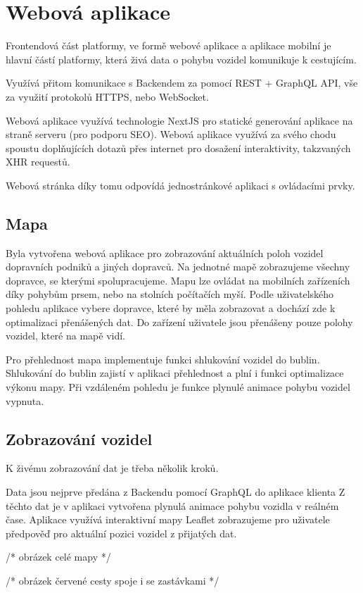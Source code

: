 \section{Webová aplikace}

Frontendová část platformy, ve formě webové aplikace a aplikace mobilní je hlavní částí platformy, která živá data o pohybu vozidel komunikuje k cestujícím.

Využívá přitom komunikace s Backendem za pomocí REST + GraphQL API, vše za využití protokolů HTTPS, nebo WebSocket.

Webová aplikace využívá technologie NextJS pro statické generování aplikace na straně serveru (pro podporu SEO).
Webová aplikace využívá za svého chodu spoustu doplňujících dotazů přes internet pro dosažení interaktivity, takzvaných XHR requestů.

Webová stránka díky tomu odpovídá jednostránkové aplikaci s ovládacími prvky.

\subsection{Mapa}
Byla vytvořena webová aplikace pro zobrazování aktuálních poloh vozidel dopravních podniků a jiných dopravců.
Na jednotné mapě zobrazujeme všechny dopravce, se kterými spolupracujeme.
Mapu lze ovládat na mobilních zařízeních díky pohybům prsem, nebo na stolních počítačích myší. Podle uživatelského pohledu aplikace vybere dopravce, které by měla zobrazovat a dochází zde k optimalizaci přenášených dat. Do zařízení uživatele jsou přenášeny pouze polohy vozidel, které na mapě vidí.

Pro přehlednost mapa implementuje funkci shlukování vozidel do bublin. Shlukování do bublin zajistí v aplikaci přehlednost a plní i funkci optimalizace výkonu mapy.
Při vzdáleném pohledu je funkce plynulé animace pohybu vozidel vypnuta.

\subsection{Zobrazování vozidel}
K živému zobrazování dat je třeba několik kroků.

Data jsou nejprve předána z Backendu pomocí GraphQL do aplikace klienta
Z těchto dat je v aplikaci vytvořena plynulá animace pohybu vozidla v reálném čase.
Aplikace využívá interaktivní mapy Leaflet zobrazujeme pro uživatele předpověď pro aktuální pozici vozidel z přijatých dat.
\par
/* obrázek celé mapy */\par
/* obrázek červené cesty spoje i se zastávkami */
